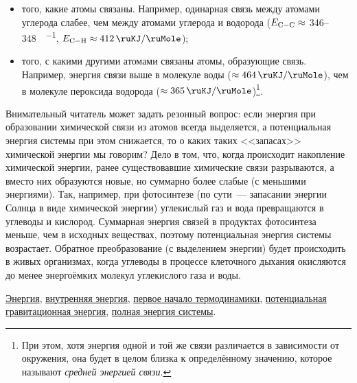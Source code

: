 \begin{itemize}
    \item того, какие атомы связаны. Например, одинарная связь между атомами углерода слабее, чем между атомами углерода и водорода ($E_{\ce{C\bond{1}C}} \approx$ \num{346}--\qty{348}{\ruKJ\per\ruMole}, $E_{\ce{C\bond{1}H}} \approx \qty{412}{\ruKJ\per\ruMole}$);
    \item того, с какими другими атомами связаны атомы, образующие связь. Например, энергия связи  выше в молекуле воды ($\approx \qty{464}{\ruKJ\per\ruMole}$), чем в молекуле пероксида водорода ($\approx \qty{365}{\ruKJ\per\ruMole}$)\footnote{При этом, хотя энергия одной и той же связи различается в зависимости от окружения, она будет в целом близка к определённому значению, которое называют \emph{средней энергией связи}.}.
\end{itemize}

Внимательный читатель может задать резонный вопрос: если энергия при образовании химической связи из атомов всегда выделяется, а потенциальная энергия системы при этом снижается, то о каких таких <<запасах>> химической энергии мы говорим? Дело в том, что, когда происходит накопление химической энергии, ранее существовавшие химические связи разрываются, а вместо них образуются новые, но суммарно более слабые (с меньшими энергиями). Так, например, при фотосинтезе (по сути~--- запасании энергии Солнца в виде химической энергии) углекислый газ и вода превращаются в углеводы и кислород. Суммарная энергия связей в продуктах фотосинтеза меньше, чем в исходных веществах, поэтому потенциальная энергия системы возрастает. Обратное преобразование (с выделением энергии) будет происходить в живых организмах, когда углеводы в процессе клеточного дыхания окисляются до менее энергоёмких молекул углекислого газа и воды.

\begin{termlist}
    \hyperref[term:energy]{Энергия},
    \hyperref[term:internal_energy]{внутренняя энергия},
    \hyperref[term:first_law_of_thermodynamics]{первое начало термодинамики},
    \hyperref[term:gravitational_potential_energy]{потенциальная гравитационная энергия},
    \hyperref[term:total_system_energy]{полная энергия системы}.
\end{termlist}

